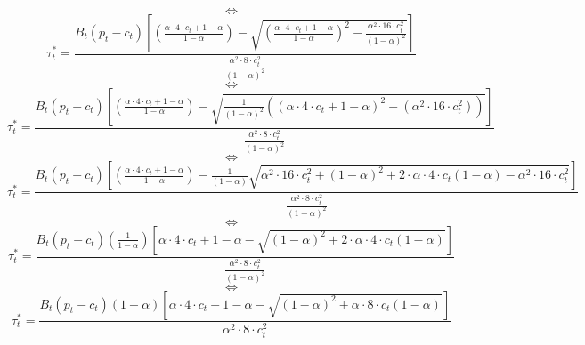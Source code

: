 \documentclass{article}
\begin{document}
$$\iff$$
\begin{equation*}
    \tau_{t}^{*}=\frac{B_{t}\left(p_{t}-c_{t}\right)\left[\left(\frac{\alpha \cdot 4\cdot c_{t}+1-\alpha}{1-\alpha}\right)-\sqrt{\left(\frac{\alpha \cdot 4\cdot c_{t}+1-\alpha}{1-\alpha}\right)^2-\frac{\alpha^{2} \cdot 16\cdot c_{t}^{2}}{(1-\alpha)^{2}}}\right]}{\frac{\alpha^{2} \cdot 8\cdot c_{t}^{2}}{(1-\alpha)^{2}}}
\end{equation*}
$$\iff$$
\begin{equation*}
    \tau_{t}^{*}=\frac{B_{t}\left(p_{t}-c_{t}\right)\left[\left(\frac{\alpha \cdot 4\cdot c_{t}+1-\alpha}{1-\alpha}\right)-\sqrt{\frac{1}{(1-\alpha)^{2}}\left(\left(\alpha \cdot 4\cdot c_{t}+1-\alpha\right)^2-\left(\alpha^{2} \cdot 16\cdot c_{t}^{2}\right)\right)}\right]} {\frac{\alpha^{2} \cdot 8\cdot c_{t}^{2}}{(1-\alpha)^{2}}}
\end{equation*}
$$\iff$$
\begin{equation*}
    \tau_{t}^{*}=\frac{B_{t}\left(p_{t}-c_{t}\right)\left[\left(\frac{\alpha \cdot 4\cdot c_{t}+1-\alpha}{1-\alpha}\right)-\frac{1}{(1-\alpha)}\sqrt{\alpha^{2} \cdot 16\cdot c_{t}^{2}+(1-\alpha)^{2}+2\cdot \alpha\cdot4\cdot c_{t}(1-\alpha)-\alpha^{2} \cdot 16\cdot c_{t}^{2}}\right]} {\frac{\alpha^{2} \cdot 8\cdot c_{t}^{2}}{(1-\alpha)^{2}}}
\end{equation*}
$$\iff$$
\begin{equation*}
    \tau_{t}^{*}=\frac{B_{t}\left(p_{t}-c_{t}\right)(\frac{1}{1-\alpha})\left[{\alpha \cdot 4\cdot c_{t}+1-\alpha}-\sqrt{(1-\alpha)^{2}+2\cdot \alpha\cdot4\cdot c_{t}(1-\alpha)}\right]} {\frac{\alpha^{2} \cdot 8\cdot c_{t}^{2}}{(1-\alpha)^{2}}}
\end{equation*}
$$\iff$$
\begin{equation*}\tag{9}
    \tau_{t}^{*}=\frac{B_{t}\left(p_{t}-c_{t}\right)(1-\alpha)\left[{\alpha \cdot 4\cdot c_{t}+1-\alpha}-\sqrt{(1-\alpha)^{2}+\alpha\cdot8\cdot c_{t}(1-\alpha)}\right]} {\alpha^{2} \cdot 8\cdot c_{t}^{2}}
\end{equation*}
\end{document}
